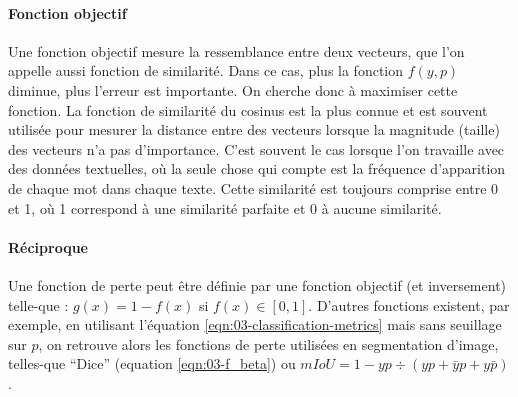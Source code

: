 \documentclass[../thesis.tex]{subfiles}
\begin{document}
    
    \vspace{-0.5em}
    \paragraph{Fonction objectif} Une fonction objectif mesure la ressemblance entre deux vecteurs, que l'on appelle aussi fonction de similarité. Dans ce cas, plus la fonction $f(y,p)$ diminue, plus l'erreur est importante. On cherche donc à maximiser cette fonction. La fonction de similarité du cosinus est la plus connue et est souvent utilisée pour mesurer la distance entre des vecteurs lorsque la magnitude (taille) des vecteurs n'a pas d'importance. C'est souvent le cas lorsque l'on travaille avec des données textuelles, où la seule chose qui compte est la fréquence d'apparition de chaque mot dans chaque texte. %
    Cette similarité est toujours comprise entre 0 et 1, où 1 correspond à une similarité parfaite et 0 à aucune similarité. %
    
    
    
    \vspace{-0.5em}
    \paragraph{Réciproque} Une fonction de perte peut être définie par une fonction objectif (et inversement) telle-que : $g(x) = 1-f(x)$ si $f(x) \in [0,1]$. D'autres fonctions existent, par exemple, en utilisant l'équation \ref{eqn:03-classification-metrics} mais sans seuillage sur $p$, on retrouve alors les fonctions de perte utilisées en segmentation d'image, telles-que ``Dice'' (equation \ref{eqn:03-f_beta}) ou $mIoU = 1 - yp \div (yp+\bar{y}p+y\bar{p})$.
    
\end{document}
